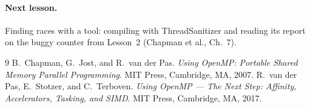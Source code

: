 \documentclass[11pt,a4paper]{article}
\begin{document}
\paragraph{Next lesson.} Finding races with a tool: compiling with ThreadSanitizer and
reading its report on the buggy counter from Lesson~2 (Chapman et al., Ch.~7).

\begin{thebibliography}{9}
 B.~Chapman, G.~Jost, and R.~van der Pas. \emph{Using OpenMP: Portable
  Shared Memory Parallel Programming}. MIT Press, Cambridge, MA, 2007.
 R.~van der Pas, E.~Stotzer, and C.~Terboven. \emph{Using OpenMP --- The Next
  Step: Affinity, Accelerators, Tasking, and SIMD}. MIT Press, Cambridge, MA, 2017.
\end{thebibliography}
\end{document}
